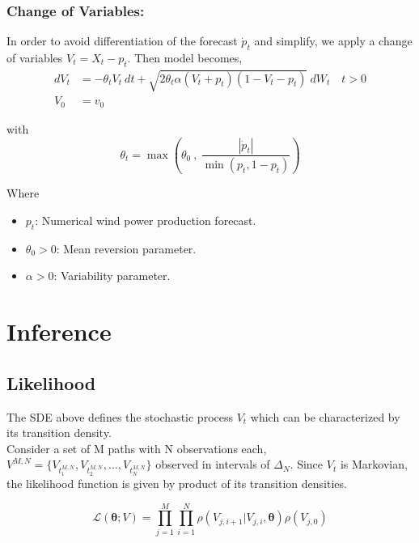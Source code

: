 \documentclass[ima, 20pt, portrait, plainboxedsections]{sciposter}
\begin{document}
\begin{multicols}{3}
\subsubsection*{Change of Variables:}
In order to avoid differentiation of the forecast $\dot{p}_t$ and simplify, we apply a change of variables $V_t = X_t - p_t$. Then  model becomes,
\begin{equation}
\begin{split}
dV_t &=  - \theta_t V_t \  dt + \sqrt{2 \theta_t \alpha (V_t +p_t ) (1-V_t-p_t)} \  dW_t \quad t > 0 \\
V_0 & = v_0
\end{split}\label{main}
\end{equation}


with
\begin{equation}
\theta_t = \max \left( \theta_0 \ , \ \frac{|\dot{p}_t|}{\min (p_t, 1-p_t)}  \right )
\end{equation}

Where
\begin{itemize}
\item $p_t$: Numerical wind power production forecast.
\item $\theta_0 >0$: Mean reversion parameter.
\item $\alpha>0$: Variability parameter.
\end{itemize}


\section*{Inference}

\subsection*{Likelihood}
The SDE above defines the stochastic process $V_t$ which can be characterized by its transition density. \\

Consider a set of M paths with N observations each, $ V^{M,N}=\{ V_{t_1^{M,N}} , V_{t_2^{M,N}} ,\ldots , V_{t_N^{M,N}} \}$ observed in intervals of $\Delta_N$. Since $V_t$ is Markovian, the likelihood function is given by  product of its  transition densities.

\begin{equation}
\mathcal{L}(\bm{\theta};V) =\prod\limits_{j=1}^M \prod\limits_{i=1}^N \rho ( {V_{j,i+1}|V_{j,i}}, \bm{\theta})  \rho (V_{j,0})
\label{likelihood}
\end{equation}


\end{multicols}
\end{document}
